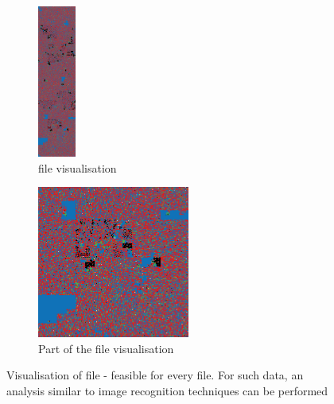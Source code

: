 \begin{figure}[htb]
    \begin{subfigure}{0.45\textwidth}
        \includegraphics[height=5cm]{imgs/crowdstrike2.png}
        \centering
        \caption{file visualisation}
        \label{fig:subim1}
    \end{subfigure}
    \begin{subfigure}{0.45\textwidth}
        \includegraphics[height=5cm]{imgs/crowdstrike.png}
        \centering
        \caption{Part of the file visualisation}
        \label{fig:subim2}
    \end{subfigure}
    \centering
    \caption{Visualisation of file - feasible for every file.
    For such data, an analysis similar to image recognition techniques can be performed}
    \label{fig:image2}
\end{figure}
\FloatBarrier
